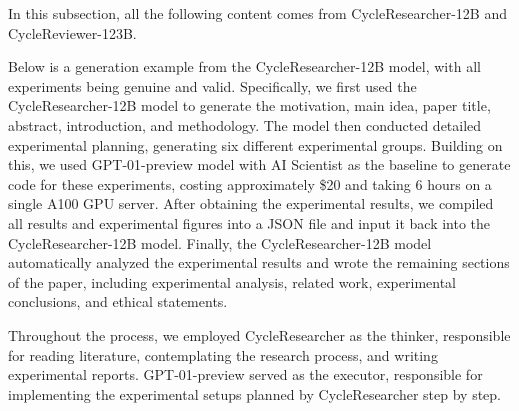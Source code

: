 {\color{warningcolor} In this subsection, all the following content comes from CycleResearcher-12B and CycleReviewer-123B.}

\textcolor[RGB]{0,0,139}{Below is a generation example from the CycleResearcher-12B model, with all experiments being genuine and valid. Specifically, we first used the CycleResearcher-12B model to generate the motivation, main idea, paper title, abstract, introduction, and methodology. The model then conducted detailed experimental planning, generating six different experimental groups. Building on this, we used GPT-01-preview model with AI Scientist as the baseline to generate code for these experiments, costing approximately \$20 and taking 6 hours on a single A100 GPU server. After obtaining the experimental results, we compiled all results and experimental figures into a JSON file and input it back into the CycleResearcher-12B model. Finally, the CycleResearcher-12B model automatically analyzed the experimental results and wrote the remaining sections of the paper, including experimental analysis, related work, experimental conclusions, and ethical statements.}

\textcolor[RGB]{0,0,139}{Throughout the process, we employed CycleResearcher as the thinker, responsible for reading literature, contemplating the research process, and writing experimental reports. GPT-01-preview served as the executor, responsible for implementing the experimental setups planned by CycleResearcher step by step.}

